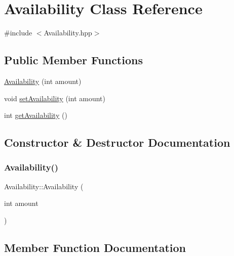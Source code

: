 \hypertarget{class_availability}{}\section{Availability Class Reference}
\label{class_availability}


{\ttfamily \#include $<$Availability.\+hpp$>$}

\subsection*{Public Member Functions}
\begin{DoxyCompactItemize}
\item 
\mbox{\hyperlink{class_availability_a12d2d1387d2c2a6c4fc1befcd6d2cae4}{Availability}} (int amount)
\item 
void \mbox{\hyperlink{class_availability_a315634988dad6624afc1330bc77e08ae}{set\+Availability}} (int amount)
\item 
int \mbox{\hyperlink{class_availability_a9775ae24b35cbe45a9b23b442f9112cd}{get\+Availability}} ()
\end{DoxyCompactItemize}


\subsection{Constructor \& Destructor Documentation}
\mbox{\label{class_availability_a12d2d1387d2c2a6c4fc1befcd6d2cae4}} 
\subsubsection{\texorpdfstring{Availability()}{Availability()}}
{\footnotesize\ttfamily Availability\+::\+Availability (\begin{DoxyParamCaption}\item[{int}]{amount }\end{DoxyParamCaption})}



\subsection{Member Function Documentation}
\mbox{\label{class_availability_a9775ae24b35cbe45a9b23b442f9112cd}} 

